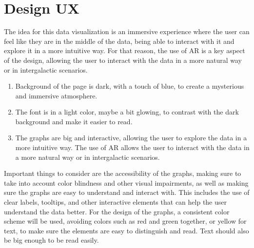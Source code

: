 \documentclass[fleqn,10pt]{SelfArx} %
\begin{document}
\maketitle %

\tableofcontents %

\thispagestyle{empty} %
\newpage %


\section{Design UX}

The idea for this data visualization is an immersive experience where the user can feel like they are in the middle of the data, being able to interact with it and explore it in a more intuitive way.
For that reason, the use of AR is a key aspect of the design, allowing the user to interact with the data in a more natural way or in intergalactic scenarios.

\begin{enumerate}[noitemsep] %
\item Background of the page is dark, with a touch of blue, to create a mysterious and immersive atmosphere.
\item The font is in a light color, maybe a bit glowing, to contrast with the dark background and make it easier to read.
\item The graphs are big and interactive, allowing the user to explore the data in a more intuitive way. The use of AR allows the user to interact with the data in a more natural way or in intergalactic scenarios.
\end{enumerate}

Important things to consider are the accessibility of the graphs, making sure to take into account color blindness and other visual impairments, as well as making sure the graphs are easy to understand and interact with.
This includes the use of clear labels, tooltips, and other interactive elements that can help the user understand the data better.
For the design of the graphs, a consistent color scheme will be used, avoiding colors such as red and green together, or yellow for text, to make sure the elements are easy to distinguish and read.
Text should also be big enough to be read easily.
\end{document}
